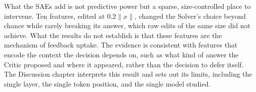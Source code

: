 What the SAEs add is not predictive power but a sparse, size-controlled place
to intervene. Ten features, edited at $0.2\lVert x\rVert$, changed the
Solver's choice beyond chance while rarely breaking its answer, which raw
edits of the same size did not achieve. What the results do not establish is
that these features are the mechanism of feedback uptake. The evidence is
consistent with features that encode the context the decision depends on,
such as what kind of answer the Critic proposed and where it appeared, rather
than the decision to defer itself. The Discussion chapter interprets this
result and sets out its limits, including the single layer, the single token
position, and the single model studied.
